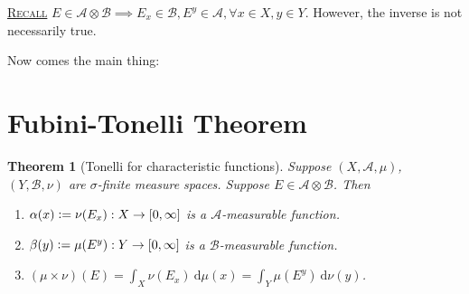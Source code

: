 \documentclass{report}
\newcommand{\cA}{\mathcal{A}}
\newcommand{\cB}{\mathcal{B}}
\newcommand{\df}{\ \mathrm{d}}
\newcommand{\defeq}{\vcentcolon=}
\newcommand{\fancyem}[1]{\underline{\textsc{#1}}}
\newtheorem{theorem}{Theorem}[chapter]
\theoremstyle{definition}
\theoremstyle{remark}
\begin{document}
\fancyem{Recall} $E \in \cA \otimes \cB \implies E_x \in \cB, E^y \in \cA, \forall x \in X, y \in Y$. However, the inverse is not necessarily true.

Now comes the main thing:
\section{Fubini-Tonelli Theorem}
\begin{theorem}[Tonelli for characteristic functions] Suppose $(X, \cA, \mu)$, $(Y, \cB, \nu)$ are \emph{$\sigma$-finite} measure spaces. Suppose $E \in \mathcal{A} \otimes \cB$. Then \begin{enumerate}
	\item $\alpha(x) \defeq \nu(E_x): X \to [0, \infty]$ is a $\cA$-measurable function.
	\item $\beta(y) \defeq \mu(E^y): Y \to [0, \infty]$ is a $\cB$-measurable function.
	\item $\displaystyle (\mu \times \nu)(E) = \int_X \nu(E_x)\df \mu(x) = \int_Y \mu\left(E^y\right) \df \nu(y)$.
\end{enumerate}
\end{theorem}
\end{document}
